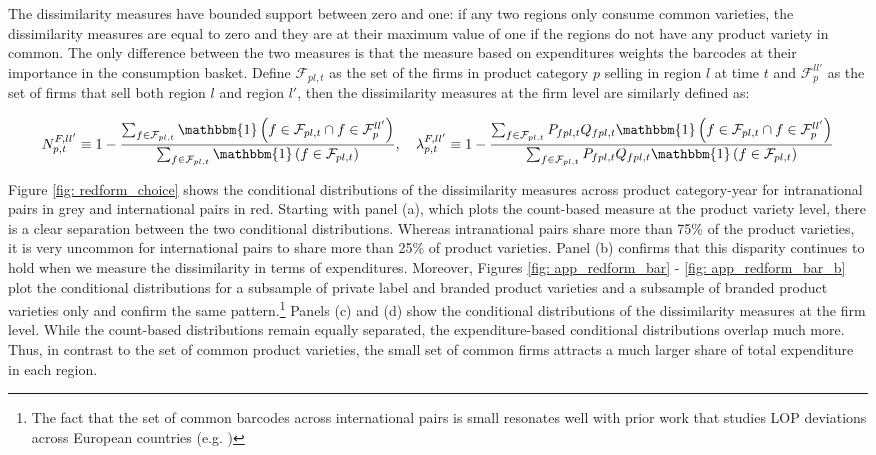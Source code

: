 The dissimilarity measures have bounded support between zero and one: if any two regions only consume common varieties, the dissimilarity measures are equal to zero and they are at their maximum value of one if the regions do not have any product variety in common. The only difference between the two measures is that the measure based on expenditures weights the barcodes at their importance in the consumption basket.  Define $\mathcal{F}_{pl,t}$ as the set of the firms in product category $p$ selling in region $l$ at time $t$ and $\mathcal{F}^{ll'}_{p}$ as the set of firms that sell both region $l$ and region $l'$, then the dissimilarity measures at the firm level are similarly defined as: 
\begin{linenomath*}
    \begin{equation*}
        N^{F,ll'}_{p,t} \equiv 
            1 - \frac{\sum_{f \in \mathcal{F}_{pl,t}} 
                        \mathbbm{1}\left(f \in \mathcal{F}_{pl,t} 
                                            \cap f \in \mathcal{F}^{ll'}_p\right)}
                     {\sum_{f \in \mathcal{F}_{pl,t}} 
                        \mathbbm{1}\left(f \in \mathcal{F}_{pl,t}\right)}, \quad 
        \lambda^{F,ll'}_{p,t} \equiv 
            1 - \frac{\sum_{f \in \mathcal{F}_{pl,t}}P_{fpl,t}Q_{fpl,t} 
                        \mathbbm{1}\left(f \in \mathcal{F}_{pl,t} 
                                            \cap f \in \mathcal{F}^{ll'}_p\right)}
                     {\sum_{f \in \mathcal{F}_{pl,t}}P_{fpl,t}Q_{fpl,t} 
                        \mathbbm{1}\left(f \in \mathcal{F}_{pl,t}\right)}
    \end{equation*}
    \end{linenomath*}
Figure \ref{fig: redform_choice} shows the conditional distributions of the dissimilarity measures across product category-year for intranational pairs in grey and international pairs in red. Starting with panel (a), which plots the count-based measure at the product variety level, there is a clear separation between the two conditional distributions. Whereas intranational pairs share more than 75\% of the product varieties, it is very uncommon for international pairs to share more than 25\% of product varieties. Panel (b) confirms that this disparity continues to hold when we measure the dissimilarity in terms of expenditures. Moreover, Figures \ref{fig: app_redform_bar} - \ref{fig: app_redform_bar_b} plot the conditional distributions for a subsample of private label and branded product varieties and a subsample of branded product varieties only and confirm the same pattern.\footnote{The fact that the set of common barcodes across international pairs is small resonates well with prior work that studies LOP deviations across European countries (e.g. \citet{Cavallo2014, Beck2020})} Panels (c) and (d) show the conditional distributions of the dissimilarity measures at the firm level. While the count-based distributions remain equally separated, the expenditure-based conditional distributions overlap much more. Thus, in contrast to the set of common product varieties, the small set of common firms attracts a much larger share of total expenditure in each region. 
